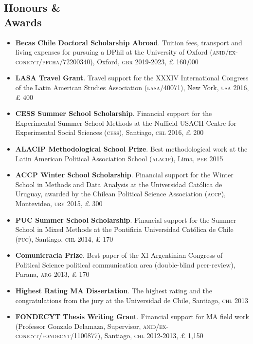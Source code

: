 \documentclass[letterpaper,margin]{res}
\begin{document}
\begin{resume}
\section{\footnotesize Honours \& \\ Awards} 

\begin{itemize}
\item{\small {\bfseries Becas Chile Doctoral Scholarship Abroad}. Tuition fees, transport and living expenses for pursuing a DPhil at the University of Oxford ({\scshape anid/ex-conicyt/pfcha}/72200340), Oxford, {\scshape gbr} 2019-2023, {\pounds} 160,000}
\item{\small {\bfseries LASA Travel Grant}. Travel support for the XXXIV International Congress of the Latin American Studies Association ({\scshape lasa}/40071), New York, {\scshape usa} 2016, {\pounds} 400}
\item{\small {\bfseries CESS Summer School Scholarship}. Financial support for the Experimental Summer School Methods at the Nuffield-USACH Centre for Experimental Social Sciences ({\scshape cess}), Santiago, {\scshape chl} 2016, {\pounds} 200}
\item {\small {\bfseries ALACIP Methodological School Prize}. Best methodological work at the Latin American Political Association School ({\scshape alacip}), Lima, {\scshape per} 2015}
\item{\small {\bfseries ACCP Winter School Scholarship}. Financial support for the Winter School in Methods and Data Analysis at the Universidad Cat\'olica de Uruguay, awarded by the Chilean Political Science Association ({\scshape accp}), Montevideo, {\scshape ury} 2015, {\pounds} 300}
\item{\small {\bfseries PUC Summer School Scholarship}. Financial support for the Summer School in Mixed Methods at the Pontificia Universidad Cat\'olica de Chile ({\scshape puc}), Santiago, {\scshape chl} 2014, {\pounds} 170}
\item{\small {\bfseries Comunicracia Prize}. Best paper of the XI Argentinian Congress of Political Science political communication area (double-blind peer-review), Parana, {\scshape arg} 2013, {\pounds} 170}
\item{\small {\bfseries Highest Rating MA Dissertation}. The highest rating and the congratulations from the jury at the Universidad de Chile, Santiago, {\scshape chl} 2013}
\item{\small {\bfseries FONDECYT Thesis Writing Grant}. Financial support for MA field work (Professor Gonzalo Delamaza, Supervisor, {\scshape anid/ex-conicyt/fondecyt}/1100877), Santiago, {\scshape chl} 2012-2013, {\pounds} 1,150} %
\end{itemize}


\end{resume}
\end{document}

